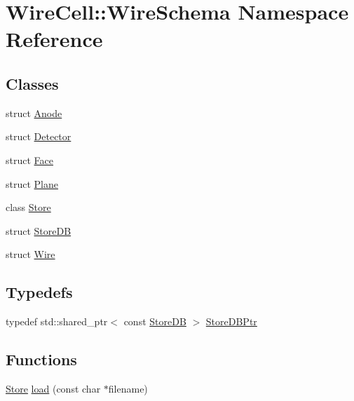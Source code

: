 \hypertarget{namespace_wire_cell_1_1_wire_schema}{}\section{Wire\+Cell\+:\+:Wire\+Schema Namespace Reference}
\label{namespace_wire_cell_1_1_wire_schema}
\subsection*{Classes}
\begin{DoxyCompactItemize}
\item 
struct \hyperlink{struct_wire_cell_1_1_wire_schema_1_1_anode}{Anode}
\item 
struct \hyperlink{struct_wire_cell_1_1_wire_schema_1_1_detector}{Detector}
\item 
struct \hyperlink{struct_wire_cell_1_1_wire_schema_1_1_face}{Face}
\item 
struct \hyperlink{struct_wire_cell_1_1_wire_schema_1_1_plane}{Plane}
\item 
class \hyperlink{class_wire_cell_1_1_wire_schema_1_1_store}{Store}
\item 
struct \hyperlink{struct_wire_cell_1_1_wire_schema_1_1_store_d_b}{Store\+DB}
\item 
struct \hyperlink{struct_wire_cell_1_1_wire_schema_1_1_wire}{Wire}
\end{DoxyCompactItemize}
\subsection*{Typedefs}
\begin{DoxyCompactItemize}
\item 
typedef std\+::shared\+\_\+ptr$<$ const \hyperlink{struct_wire_cell_1_1_wire_schema_1_1_store_d_b}{Store\+DB} $>$ \hyperlink{namespace_wire_cell_1_1_wire_schema_a9b93b8d397f153737ab0ba52066308e2}{Store\+D\+B\+Ptr}
\end{DoxyCompactItemize}
\subsection*{Functions}
\begin{DoxyCompactItemize}
\item 
\hyperlink{class_wire_cell_1_1_wire_schema_1_1_store}{Store} \hyperlink{namespace_wire_cell_1_1_wire_schema_a0543dcae10ded4ff64c32a3e43743cbb}{load} (const char $\ast$filename)
\end{DoxyCompactItemize}


